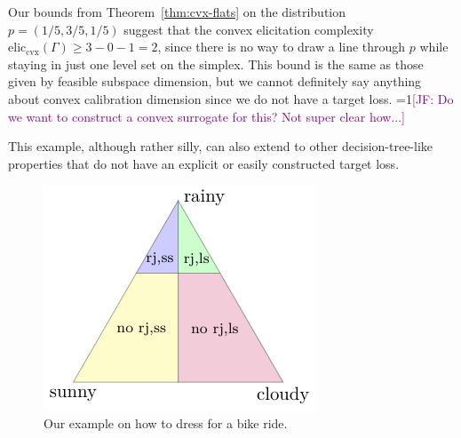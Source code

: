 \documentclass{article}
\newcommand{\Comments}{1}
\newcommand{\mynote}[2]{\ifnum\Comments=1\textcolor{#1}{#2}\fi}
\newcommand{\jessie}[1]{\mynote{purple}{[JF: #1]}}
\newcommand{\eliccvx}{\mathrm{elic}_\mathrm{cvx}}
\begin{document}
Our bounds from Theorem~\ref{thm:cvx-flats} on the distribution $p = (1/5, 3/5, 1/5)$ suggest that the convex elicitation complexity $\eliccvx(\Gamma) \geq 3 - 0 -1 = 2$, since there is no way to draw a line through $p$ while staying in just one level set on the simplex.
This bound is the same as those given by feasible subspace dimension, but we cannot definitely say anything about convex calibration dimension since we do not have a target loss.
\jessie{Do we want to construct a convex surrogate for this?  Not super clear how...}

This example, although rather silly, can also extend to other decision-tree-like properties that do not have an explicit or easily constructed target loss.

\begin{figure}
	\centering
	\includegraphics[width=0.4\linewidth]{tikz/t-example.pdf}
	\caption{Our example on how to dress for a bike ride.}
	\label{fig:t-example}
\end{figure}
\end{document}
